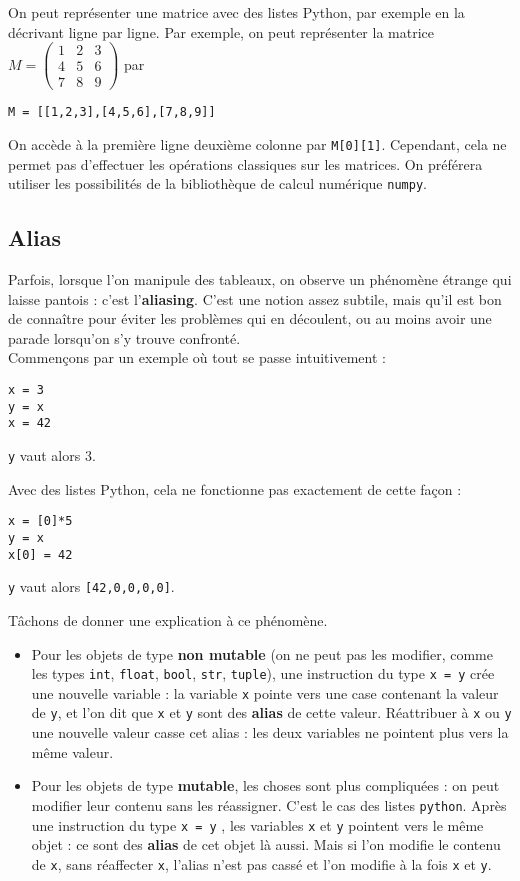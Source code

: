 On peut représenter une matrice avec des listes Python, par exemple en la décrivant ligne par 
ligne. 
Par exemple, on peut représenter la matrice 
$
  M=\begin{pmatrix}
    1&2&3 \\ 4&5&6 \\ 7&8&9
  \end{pmatrix}
$
par
\begin{lstlisting}
M = [[1,2,3],[4,5,6],[7,8,9]]
\end{lstlisting}
On accède à la première ligne deuxième colonne par \texttt{M[0][1]}.
Cependant, cela ne permet pas d'effectuer les opérations classiques sur les matrices. On préférera 
utiliser les possibilités de la bibliothèque de calcul numérique \texttt{numpy}.

\subsection{Alias}

Parfois, lorsque l'on manipule des tableaux, on observe un phénomène étrange qui laisse pantois : 
c'est l'\textbf{aliasing}. C'est une notion assez subtile, mais qu'il est bon de connaître pour 
éviter les problèmes qui en découlent, ou au moins avoir une parade lorsqu'on s'y trouve 
confronté.\\


Commençons par un exemple où tout se passe intuitivement :
\begin{lstlisting}
x = 3
y = x
x = 42
\end{lstlisting}

\texttt{y} vaut alors 3. 

Avec des listes Python, cela ne fonctionne pas exactement de cette façon : 
\begin{lstlisting}
x = [0]*5
y = x
x[0] = 42
\end{lstlisting}
\texttt{y} vaut alors \texttt{[42,0,0,0,0]}.

Tâchons de donner une explication à ce phénomène.
\begin{itemize}
  \item Pour les objets de type \textbf{non mutable} (on ne peut pas les modifier, comme les types 
  \texttt{int}, \texttt{float}, \texttt{bool}, \texttt{str}, \texttt{tuple}), une instruction du type \texttt{x = y} 
crée une nouvelle variable : la variable \texttt{x} pointe vers une case contenant la valeur de 
\texttt{y}, et l'on dit que \texttt{x} et \texttt{y} sont des \textbf{alias} de cette valeur. Réattribuer à 
\texttt{x} ou \texttt{y} une nouvelle valeur casse cet alias : les deux variables ne pointent plus vers la 
même valeur.
  \item Pour les objets de type \textbf{mutable}, les choses sont plus compliquées : on peut modifier 
leur contenu sans les réassigner. C'est le cas des listes \texttt{python}. Après une instruction du type 
\texttt{x = y} , les variables \texttt{x} et \texttt{y} pointent vers le même objet : ce sont des 
\textbf{alias} de cet objet là aussi. Mais si l'on modifie le contenu de \texttt{x}, sans réaffecter 
\texttt{x}, l'alias n'est pas cassé et l'on modifie à la fois \texttt{x} et \texttt{y}.
\end{itemize}



